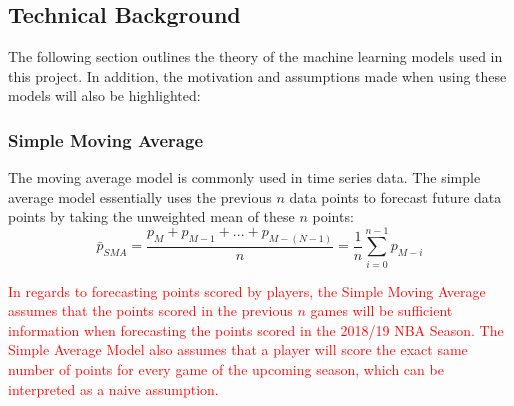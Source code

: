 \documentclass[a4paper,11pt,twoside]{article}
\begin{document}
\subsection{Technical Background}
The following section outlines the theory of the machine learning models used in this project. In addition, the motivation and assumptions made when using these models will also be highlighted:


\subsubsection{Simple Moving Average}
The moving average model is commonly used in time series data. The simple average model essentially uses the previous $n$ data points to forecast future data points by taking the unweighted mean of these $n$ points:
\begin{equation}
\bar{p}_{SMA} = \frac{p_{M} + p_{M-1} + ... + p_{M-(N-1)}} {n} 
= \frac{1}{n} \sum_{i=0}^{n-1}p_{M-i}
\end{equation}

\textcolor{red}{In regards to forecasting points scored by players, the Simple Moving Average assumes that the points scored in the previous $n$ games will be sufficient information when forecasting the points scored in the 2018/19 NBA Season. The Simple Average Model also assumes that a player will score the exact same number of points for every game of the upcoming season, which can be interpreted as a naive assumption.}
\end{document}
